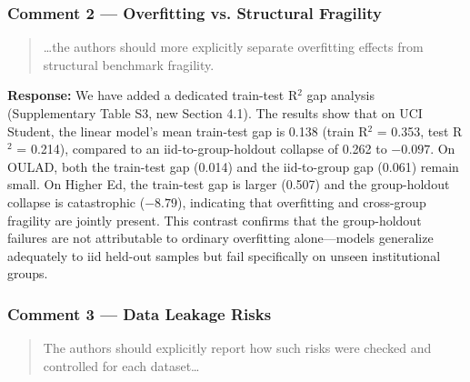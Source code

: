 \documentclass[12pt,a4paper]{article}
\begin{document}
\subsubsection*{Comment 2 --- Overfitting vs. Structural Fragility}

\begin{quote}
\ldots the authors should more explicitly separate overfitting effects from structural benchmark fragility.
\end{quote}

\textbf{Response:} We have added a dedicated train-test R$^2$ gap analysis (Supplementary Table S3, new Section 4.1). The results show that on UCI Student, the linear model's mean train-test gap is 0.138 (train R$^2$ = 0.353, test R$^2$ = 0.214), compared to an iid-to-group-holdout collapse of 0.262 to $-0.097$. On OULAD, both the train-test gap (0.014) and the iid-to-group gap (0.061) remain small. On Higher Ed, the train-test gap is larger (0.507) and the group-holdout collapse is catastrophic ($-8.79$), indicating that overfitting and cross-group fragility are jointly present. This contrast confirms that the group-holdout failures are not attributable to ordinary overfitting alone---models generalize adequately to iid held-out samples but fail specifically on unseen institutional groups.

\subsubsection*{Comment 3 --- Data Leakage Risks}

\begin{quote}
The authors should explicitly report how such risks were checked and controlled for each dataset\ldots
\end{quote}
\end{document}
